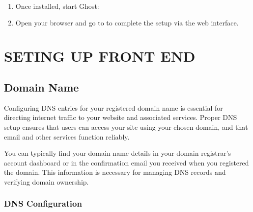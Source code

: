 \documentclass[letterpaper,10pt,english]{sphinxmanual}
\begin{document}
\begin{enumerate}
\sphinxAtStartPar
Ghost\sphinxhyphen{}CLI can set up Nginx and SSL for you during installation. Follow the prompts to enable these features.

\item {} 
\sphinxAtStartPar
{}

\sphinxAtStartPar
Once installed, start Ghost:

\item {} 
\sphinxAtStartPar
{}

\sphinxAtStartPar
Open your browser and go to  to complete the setup via the web interface.

\end{enumerate}

\sphinxstepscope


\chapter{SETING UP FRONT END}
\label{\detokenize{setup_frontend:seting-up-front-end}}\label{\detokenize{setup_frontend::doc}}

\section{Domain Name}
\label{\detokenize{setup_frontend:domain-name}}
\noindent{}

\sphinxAtStartPar
Configuring DNS entries for your registered domain name is essential for directing internet traffic to your website and associated services. Proper DNS setup ensures that users can access your site using your chosen domain, and that email and other services function reliably.

\sphinxAtStartPar
You can typically find your domain name details in your domain registrar’s account dashboard or in the confirmation email you received when you registered the domain. This information is necessary for managing DNS records and verifying domain ownership.


\subsection{DNS Configuration}
\label{\detokenize{setup_frontend:dns-configuration}}
\end{document}
